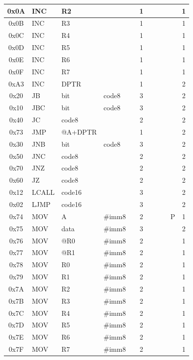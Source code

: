 \documentclass[a4paper,twoside,12pt]{book}
\begin{document}
{\begin{longtable}{|c|l|lll|c|llll|c|}
		0x0A	& INC	& R2	&	&	& 1	&	&	&	&	& 1	\\\hline
		0x0B	& INC	& R3	&	&	& 1	&	&	&	&	& 1	\\\hline
		0x0C	& INC	& R4	&	&	& 1	&	&	&	&	& 1	\\\hline
		0x0D	& INC	& R5	&	&	& 1	&	&	&	&	& 1	\\\hline
		0x0E	& INC	& R6	&	&	& 1	&	&	&	&	& 1	\\\hline
		0x0F	& INC	& R7	&	&	& 1	&	&	&	&	& 1	\\\hline
		0xA3	& INC	& DPTR	&	&	& 1	&	&	&	&	& 2	\\\hline
		0x20	& JB	& bit	& code8	&	& 3	&	&	&	&	& 2	\\\hline
		0x10	& JBC	& bit	& code8	&	& 3	&	&	&	&	& 2	\\\hline
		0x40	& JC	& code8	&	&	& 2	&	&	&	&	& 2	\\\hline
		0x73	& JMP	&@A+DPTR&	&	& 1	&	&	&	&	& 2	\\\hline
		0x30	& JNB	& bit	& code8	&	& 3	&	&	&	&	& 2	\\\hline
		0x50	& JNC	& code8	&	&	& 2	&	&	&	&	& 2	\\\hline
		0x70	& JNZ	& code8	&	&	& 2	&	&	&	&	& 2	\\\hline
		0x60	& JZ	& code8	&	&	& 2	&	&	&	&	& 2	\\\hline
		0x12	& LCALL	& code16&	&	& 3	&	&	&	&	& 2	\\\hline
		0x02	& LJMP	& code16&	&	& 3	&	&	&	&	& 2	\\\hline
		0x74	& MOV	& A	& \#imm8&	& 2	&	&	&	& P	& 1	\\\hline
		0x75	& MOV	& data	& \#imm8&	& 3	&	&	&	&	& 2	\\\hline
		0x76	& MOV	& @R0	& \#imm8&	& 2	&	&	&	&	& 1	\\\hline
		0x77	& MOV	& @R1	& \#imm8&	& 2	&	&	&	&	& 1	\\\hline
		0x78	& MOV	& R0	& \#imm8&	& 2	&	&	&	&	& 1	\\\hline
		0x79	& MOV	& R1	& \#imm8&	& 2	&	&	&	&	& 1	\\\hline
		0x7A	& MOV	& R2	& \#imm8&	& 2	&	&	&	&	& 1	\\\hline
		0x7B	& MOV	& R3	& \#imm8&	& 2	&	&	&	&	& 1	\\\hline
		0x7C	& MOV	& R4	& \#imm8&	& 2	&	&	&	&	& 1	\\\hline
		0x7D	& MOV	& R5	& \#imm8&	& 2	&	&	&	&	& 1	\\\hline
		0x7E	& MOV	& R6	& \#imm8&	& 2	&	&	&	&	& 1	\\\hline
		0x7F	& MOV	& R7	& \#imm8&	& 2	&	&	&	&	& 1	\\\hline

\end{longtable}}
\end{document}

